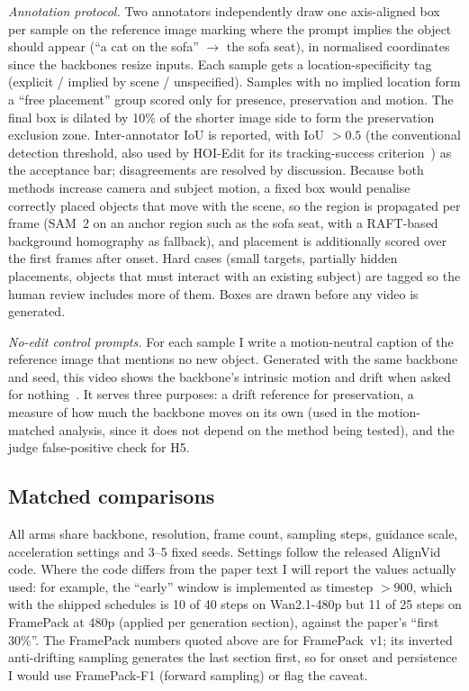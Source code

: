 \documentclass[10pt,a4paper]{article}
\begin{document}
\emph{Annotation protocol.} Two annotators independently draw one axis-aligned box per sample on the reference image marking where the prompt implies the object should appear (``a cat on the sofa'' $\to$ the sofa seat), in normalised coordinates since the backbones resize inputs. Each sample gets a location-specificity tag (explicit / implied by scene / unspecified). Samples with no implied location form a ``free placement'' group scored only for presence, preservation and motion. The final box is dilated by 10\% of the shorter image side to form the preservation exclusion zone. Inter-annotator IoU is reported, with IoU $> 0.5$ (the conventional detection threshold, also used by HOI-Edit for its tracking-success criterion~\cite{hoiedit}) as the acceptance bar; disagreements are resolved by discussion. Because both methods increase camera and subject motion, a fixed box would penalise correctly placed objects that move with the scene, so the region is propagated per frame (SAM~2 on an anchor region such as the sofa seat, with a RAFT-based background homography as fallback), and placement is additionally scored over the first frames after onset. Hard cases (small targets, partially hidden placements, objects that must interact with an existing subject) are tagged so the human review includes more of them. Boxes are drawn before any video is generated.

\emph{No-edit control prompts.} For each sample I write a motion-neutral caption of the reference image that mentions no new object. Generated with the same backbone and seed, this video shows the backbone's intrinsic motion and drift when asked for nothing~\cite{hoiedit}. It serves three purposes: a drift reference for preservation, a measure of how much the backbone moves on its own (used in the motion-matched analysis, since it does not depend on the method being tested), and the judge false-positive check for H5.

\subsection{Matched comparisons}

All arms share backbone, resolution, frame count, sampling steps, guidance scale, acceleration settings and 3--5 fixed seeds. Settings follow the released AlignVid code. Where the code differs from the paper text I will report the values actually used: for example, the ``early'' window is implemented as timestep $> 900$, which with the shipped schedules is 10 of 40 steps on Wan2.1-480p but 11 of 25 steps on FramePack at 480p (applied per generation section), against the paper's ``first 30\%''. The FramePack numbers quoted above are for FramePack~v1; its inverted anti-drifting sampling generates the last section first, so for onset and persistence I would use FramePack-F1 (forward sampling) or flag the caveat.
\end{document}
